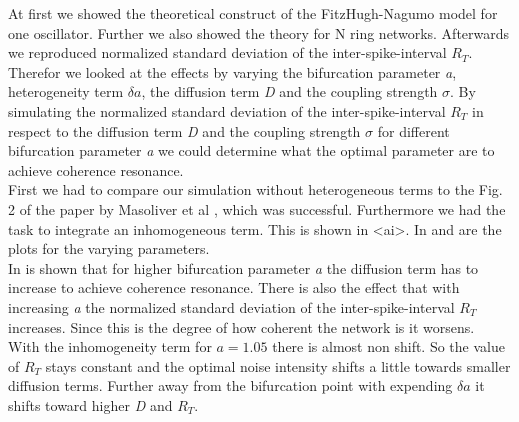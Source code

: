 At first we showed the theoretical construct of the FitzHugh-Nagumo model for one oscillator. Further we also showed the theory for N ring networks. 
Afterwards  we reproduced normalized standard deviation of
the inter-spike-interval $R_T$. Therefor we looked at the effects by varying the bifurcation parameter \textit{a}, heterogeneity term \textit{$\delta a$}, the diffusion term \textit{D} and the coupling strength \textit{$\sigma$}.
By simulating the normalized standard deviation of
the inter-spike-interval $R_T$ in respect to the diffusion term \textit{D} and the coupling strength \textit{$\sigma$} for different bifurcation parameter \textit{a} we could determine what the optimal parameter are to achieve coherence resonance.\\
First we had to compare our simulation without heterogeneous terms to the Fig. 2 of the paper by Masoliver et al \cite{Masoliver2017}, which was successful. Furthermore we had the task to integrate an inhomogeneous term. This is shown in \eq<ai>. In  and  are the plots  for the varying parameters.\\
In  is shown that for higher bifurcation parameter \textit{a} the diffusion term has to increase to achieve coherence resonance. There is also the effect that with increasing \textit{a} the normalized standard deviation of
the inter-spike-interval $R_T$ increases. Since this is the degree of how coherent the network is it worsens. \\
With the inhomogeneity term for $a=1.05$ there is almost non shift. So the value of $R_T$ stays constant and the optimal noise intensity shifts a little towards smaller diffusion terms. Further away from the bifurcation point with expending \textit{$\delta a$} it shifts toward higher  \textit{D} and $R_T$.\\



